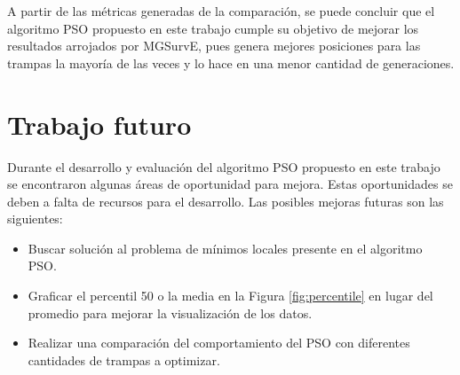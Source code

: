 \documentclass[letterpaper]{report}
\begin{document}
    A partir de las métricas generadas de la comparación, se puede concluir que
    el algoritmo PSO propuesto en este trabajo cumple su objetivo de mejorar
    los resultados arrojados por MGSurvE, pues genera mejores posiciones para
    las trampas la mayoría de las veces y lo hace en una menor cantidad de
    generaciones.

    \section{Trabajo futuro}

    Durante el desarrollo y evaluación del algoritmo PSO propuesto en este
    trabajo se encontraron algunas áreas de oportunidad para mejora. Estas
    oportunidades se deben a falta de recursos para el desarrollo. Las posibles
    mejoras futuras son las siguientes:

    \begin{itemize}
      \item Buscar solución al problema de mínimos locales presente en el
        algoritmo PSO.
      \item Graficar el percentil 50 o la media en la Figura
        \ref{fig:percentile} en lugar del promedio para mejorar la visualización
        de los datos.
      \item Realizar una comparación del comportamiento del PSO con diferentes
        cantidades de trampas a optimizar.
    \end{itemize}    
\end{document}
